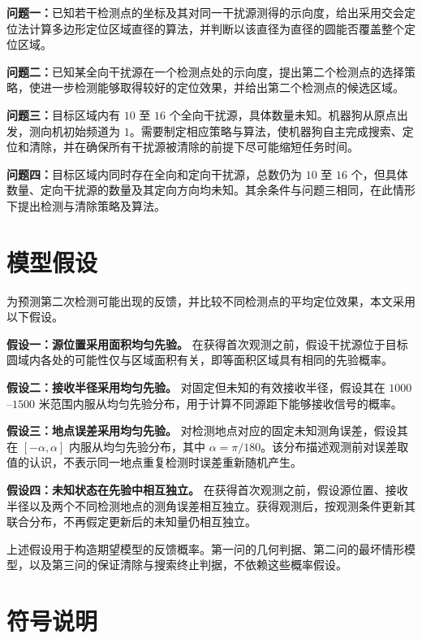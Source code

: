 \documentclass[UTF8,a4paper,zihao=-4,fontset=none]{ctexart}
\begin{document}
\textbf{问题一：}已知若干检测点的坐标及其对同一干扰源测得的示向度，给出采用交会定位法计算多边形定位区域直径的算法，并判断以该直径为直径的圆能否覆盖整个定位区域。

\textbf{问题二：}已知某全向干扰源在一个检测点处的示向度，提出第二个检测点的选择策略，使进一步检测能够取得较好的定位效果，并给出第二个检测点的候选区域。

\textbf{问题三：}目标区域内有 \(10\) 至 \(16\) 个全向干扰源，具体数量未知。机器狗从原点出发，测向机初始频道为 \(1\)。需要制定相应策略与算法，使机器狗自主完成搜索、定位和清除，并在确保所有干扰源被清除的前提下尽可能缩短任务时间。

\textbf{问题四：}目标区域内同时存在全向和定向干扰源，总数仍为 \(10\) 至 \(16\) 个，但具体数量、定向干扰源的数量及其定向方向均未知。其余条件与问题三相同，在此情形下提出检测与清除策略及算法。


\section{模型假设}

为预测第二次检测可能出现的反馈，并比较不同检测点的平均定位效果，本文采用以下假设。

\textbf{假设一：源位置采用面积均匀先验。} 在获得首次观测之前，假设干扰源位于目标圆域内各处的可能性仅与区域面积有关，即等面积区域具有相同的先验概率。

\textbf{假设二：接收半径采用均匀先验。} 对固定但未知的有效接收半径，假设其在 \(1000\)--\(1500\) 米范围内服从均匀先验分布，用于计算不同源距下能够接收信号的概率。

\textbf{假设三：地点误差采用均匀先验。} 对检测地点对应的固定未知测角误差，假设其在 \([-\alpha,\alpha]\) 内服从均匀先验分布，其中 \(\alpha=\pi/180\)。该分布描述观测前对误差取值的认识，不表示同一地点重复检测时误差重新随机产生。

\textbf{假设四：未知状态在先验中相互独立。} 在获得首次观测之前，假设源位置、接收半径以及两个不同检测地点的测角误差相互独立。获得观测后，按观测条件更新其联合分布，不再假定更新后的未知量仍相互独立。

上述假设用于构造期望模型的反馈概率。第一问的几何判据、第二问的最坏情形模型，以及第三问的保证清除与搜索终止判据，不依赖这些概率假设。

\section{符号说明}
\end{document}
